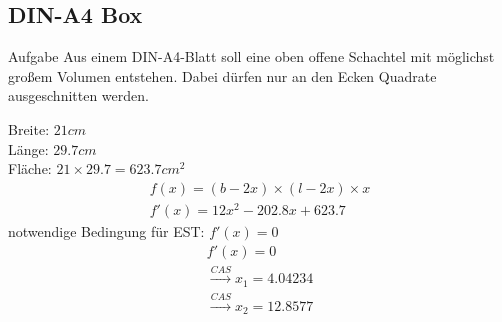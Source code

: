 \documentclass[arbeitsmappe.tex]{subfiles}
\begin{document}
    \subsection{DIN-A4 Box}

    \begin{rblock}{Aufgabe}
        Aus einem DIN-A4-Blatt soll eine oben offene Schachtel mit möglichst großem Volumen entstehen.
        Dabei dürfen nur an den Ecken Quadrate ausgeschnitten werden.
    \end{rblock}
    \noindent
    Breite: $21cm$ \\
    Länge: $29.7cm$ \\
    Fläche: $21 \times 29.7 = 623.7cm^2$ \\
    \begin{align*}
	    f(x) = (b - 2x) \times (l - 2x) \times x \\
	    f'(x) = 12x^2 - 202.8x + 623.7	 \end{align*}
    notwendige Bedingung für EST: $f'(x) = 0$ \\
    \begin{align*}
      f'(x) = 0 \\
	   \xrightarrow{CAS} x_1 = 4.04234 \\
      \xrightarrow{CAS} x_2 = 12.8577 \\
    \end{align*}
\end{document}

